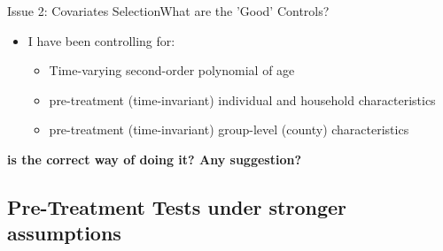 \documentclass{beamer}
\begin{document}
\begin{frame}{Issue 2: Covariates Selection}{What are the 'Good' Controls?}
    
    \begin{itemize}
        \item I have been controlling for:

        \begin{itemize}
            \item Time-varying second-order polynomial of age
            \item pre-treatment (time-invariant) individual and household characteristics
            \item pre-treatment (time-invariant) group-level (county) characteristics
        \end{itemize}
    \end{itemize}

    \begin{center}
        \textbf{is the correct way of doing it? Any suggestion?}
    \end{center}

\end{frame}


\subsection{Pre-Treatment Tests under stronger assumptions}
\end{document}
